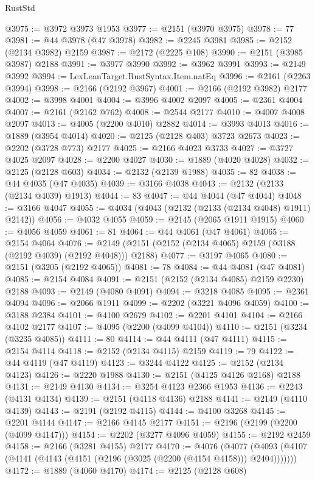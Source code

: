 \begin{lexlean}{RustStd}
\begin{coremodule}
@3975 := @3972 @3973 @1953
@3977 := @2151 (@3970 @3975)
@3978 := 77
@3981 := @44 @3978 (@47 @3978)
@3982 := @2245 @3981
@3985 := @2152 (@2134 @3982) @2159
@3987 := @2172 (@2225 @108)
@3990 := @2151 (@3985 @3987) @2188
@3991 := @3977 @3990
@3992 := @3962 @3991
@3993 := @2149 @3992
@3994 := LexLeanTarget.RustSyntax.Item.natEq
@3996 := @2161 (@2263 @3994)
@3998 := @2166 (@2192 @3967)
@4001 := @2166 (@2192 @3982) @2177
@4002 := @3998 @4001
@4004 := @3996 @4002 @2097
@4005 := @2361 @4004
@4007 := @2161 (@2162 @762)
@4008 := @2544 @2177
@4010 := @4007 @4008 @2097
@4013 := @4005 (@2200 @4010) @2882
@4014 := @3993 @4013
@4016 := @1889 (@3954 @4014)
@4020 := @2125 (@2128 @403) @3723 @2673
@4023 := @2202 (@3728 @773) @2177
@4025 := @2166 @4023 @3733
@4027 := @3727 @4025 @2097
@4028 := @2200 @4027
@4030 := @1889 (@4020 @4028)
@4032 := @2125 (@2128 @603)
@4034 := @2132 (@2139 @1988)
@4035 := 82
@4038 := @44 @4035 (@47 @4035)
@4039 := @3166 @4038
@4043 := @2132 (@2133 (@2134 @4039) @1913)
@4044 := 83
@4047 := @44 @4044 (@47 @4044)
@4048 := @3166 @4047
@4055 := @4034 (@4043 (@2132 (@2133 (@2134 @4048) @1911) @2142))
@4056 := @4032 @4055
@4059 := @2145 (@2065 @1911 @1915)
@4060 := @4056 @4059
@4061 := 81
@4064 := @44 @4061 (@47 @4061)
@4065 := @2154 @4064
@4076 := @2149 (@2151 (@2152 (@2134 @4065) @2159 (@3188 (@2192 @4039) (@2192 @4048))) @2188)
@4077 := @3197 @4065
@4080 := @2151 (@3205 (@2192 @4065))
@4081 := 78
@4084 := @44 @4081 (@47 @4081)
@4085 := @2154 @4084
@4091 := @2151 (@2152 (@2134 @4085) @2159 @2230) @2188
@4093 := @2149 (@4080 @4091)
@4094 := @3218 @4085
@4095 := @2361 @4094
@4096 := @2066 @1911
@4099 := @2202 (@3221 @4096 @4059)
@4100 := @3188 @2384
@4101 := @4100 @2679
@4102 := @2201 @4101
@4104 := @2166 @4102 @2177
@4107 := @4095 (@2200 (@4099 @4104))
@4110 := @2151 (@3234 (@3235 @4085))
@4111 := 80
@4114 := @44 @4111 (@47 @4111)
@4115 := @2154 @4114
@4118 := @2152 (@2134 @4115) @2159
@4119 := 79
@4122 := @44 @4119 (@47 @4119)
@4123 := @3244 @4122
@4125 := @2152 (@2134 @4123)
@4126 := @2220 @1988
@4130 := @2151 (@4125 @4126 @2168) @2188
@4131 := @2149 @4130
@4134 := @3254 @4123 @2366 @1953
@4136 := @2243 (@4131 @4134)
@4139 := @2151 (@4118 @4136) @2188
@4141 := @2149 (@4110 @4139)
@4143 := @2191 (@2192 @4115)
@4144 := @4100 @3268
@4145 := @2201 @4144
@4147 := @2166 @4145 @2177
@4151 := @2196 (@2199 (@2200 (@4099 @4147)))
@4154 := @2202 (@3277 @4096 @4059)
@4155 := @2192 @2459
@4158 := @2166 (@3281 @4155) @2177
@4170 := @4076
    (@4077 (@4093 (@4107 (@4141 (@4143 (@4151 (@2196 (@3025 (@2200 (@4154 @4158))) @2404)))))))
@4172 := @1889 (@4060 @4170)
@4174 := @2125 (@2128 @608)

\end{coremodule}
\end{lexlean}
